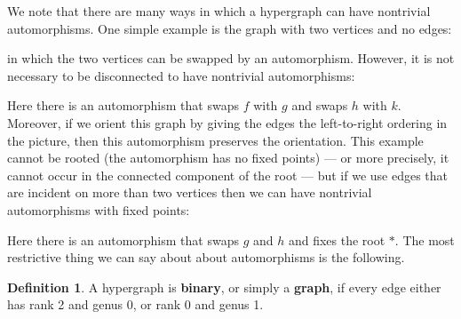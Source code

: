 \documentclass{article}
\theoremstyle{definition}
\newtheorem{defn}[thm]{Definition}
\theoremstyle{remark}
\def\genus{\mathsf{genus}}
\def\rank{\mathsf{rank}}
\begin{document}
We note that there are many ways in which a hypergraph can have nontrivial automorphisms.
One simple example is the graph with two vertices and no edges:
\begin{center}
\end{center}
in which the two vertices can be swapped by an automorphism.
However, it is not necessary to be disconnected to have nontrivial automorphisms:
\begin{center}
\end{center}
Here there is an automorphism that swaps $f$ with $g$ and swaps $h$ with $k$.
Moreover, if we orient this graph by giving the edges the left-to-right ordering in the picture, then this automorphism preserves the orientation.
This example cannot be rooted (the automorphism has no fixed points) --- or more precisely, it cannot occur in the connected component of the root --- but if we use edges that are incident on more than two vertices then we can have nontrivial automorphisms with fixed points:
\begin{center}
\end{center}
Here there is an automorphism that swaps $g$ and $h$ and fixes the root $\ast$.
The most restrictive thing we can say about about automorphisms is the following.

\begin{defn}
  A hypergraph is \textbf{binary}, or simply a \textbf{graph}, if %
  every edge either has rank 2 and genus 0, or rank 0 and genus 1.
\end{defn}
\end{document}
